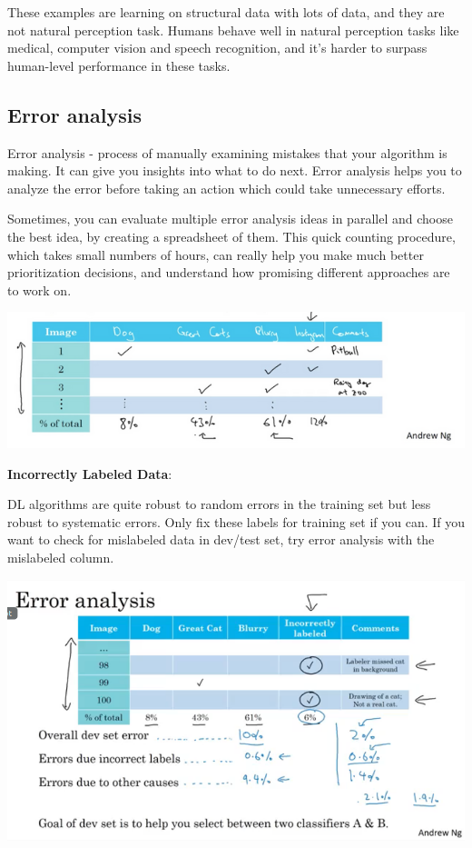 \documentclass{article}
\begin{document}
\noindent These examples are learning on structural data with lots of data, and they are not natural perception task. Humans behave well in natural perception tasks like medical, computer vision and speech recognition, and it's harder to surpass human-level performance in these tasks.

\subsection{Error analysis}

\noindent Error analysis - process of manually examining mistakes that your algorithm is making. It can give you insights into what to do next. Error analysis helps you to analyze the error before taking an action which could take unnecessary efforts.

\bigskip

\noindent Sometimes, you can evaluate multiple error analysis ideas in parallel and choose the best idea, by creating a spreadsheet of them. This quick counting procedure, which takes small numbers of hours, can really help you make much better prioritization decisions, and understand how promising different approaches are to work on.

\begin{center}
\includegraphics[scale=0.5]{./images/error_analysis.png}
\end{center}

\noindent \textbf{Incorrectly Labeled Data}:

\noindent DL algorithms are quite robust to random errors in the training set but less robust to systematic errors. Only fix these labels for training set if you can. If you want to check for mislabeled data in dev/test set, try error analysis with the mislabeled column.

\begin{center}
\includegraphics[scale=0.4]{./images/incorrectly_labeled_data.png}
\end{center}
\end{document}
